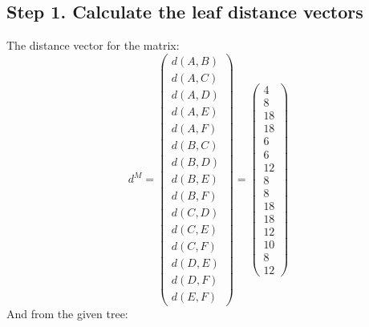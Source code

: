 \subsection*{Step 1. Calculate the leaf distance vectors}
The distance vector for the matrix: 
\[
d^M = 
\begin{pmatrix}
d(A,B) \\ d(A,C) \\ d(A, D) \\ d(A,E) \\d(A,F) \\ d(B,C) \\ d(B,D) \\ d(B,E) \\ d(B,F) \\ d(C,D) \\ d(C,E) \\d(C,F) \\ d(D,E) \\ d(D,F) \\ d(E,F)
\end{pmatrix} = 
\begin{pmatrix}
4 \\ 8 \\18\\18\\6\\6\\12\\8\\8\\18\\18\\12\\10\\8\\12
\end{pmatrix} 
\]
And from the given tree: 
